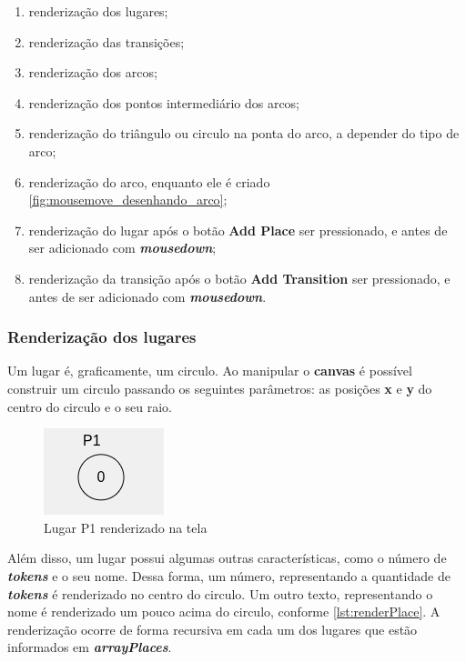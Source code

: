 \documentclass[
	12pt,				%
	openright,			%
	oneside,			%
	a4paper,			%
	english,			%
	brazil				%
	]{abntex2}
\begin{document}
\begin{enumerate}
	\item renderização dos lugares;
	\item renderização das transições;
	\item renderização dos arcos;
	\item renderização dos pontos intermediário dos arcos;
	\item renderização do triângulo ou circulo na ponta do arco, a depender do tipo de arco;
	\item renderização do arco, enquanto ele é criado \ref{fig:mousemove_desenhando_arco};
	\item renderização do lugar após o botão \textbf{Add Place} ser pressionado, e antes de ser adicionado com \textbf{\textit{mousedown}};
	\item renderização da transição após o botão \textbf{Add Transition} ser pressionado, e antes de ser adicionado com \textbf{\textit{mousedown}}.
\end{enumerate}

\subsubsection*{Renderização dos lugares}

Um lugar é, graficamente, um circulo. Ao manipular o \textbf{canvas} é possível construir um circulo passando os seguintes parâmetros: as posições \textbf{x} e \textbf{y} do centro do circulo e o seu raio. 



\begin{figure}[ht] 
	\centering
	\includegraphics[scale=1]{figuras/renderPlace.png}
	\caption[renderPlace]{Lugar P1 renderizado na tela}
	\label{fig:renderPlace}
\end{figure}
\FloatBarrier

Além disso, um lugar possui algumas outras características, como o número de \textbf{\textit{tokens}} e o seu nome. Dessa forma, um número, representando a quantidade de \textbf{\textit{tokens}} é renderizado no centro do circulo. Um outro texto, representando o nome é renderizado um pouco acima do circulo, conforme \ref{lst:renderPlace}. A renderização ocorre de forma recursiva em cada um dos lugares que estão informados em \textbf{\textit{arrayPlaces}}.
\end{document}
